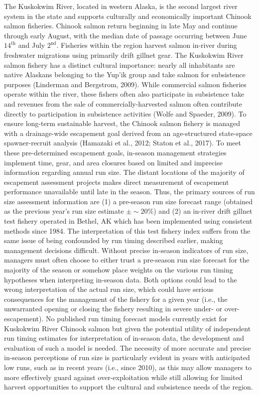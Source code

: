 \documentclass[12pt,]{book}
\theoremstyle{definition}
\theoremstyle{definition}
\theoremstyle{definition}
\theoremstyle{remark}
\begin{document}
The Kuskokwim River, located in western Alaska, is the second largest
river system in the state and supports culturally and economically
important Chinook salmon fisheries. Chinook salmon return beginning in
late May and continue through early August, with the median date of
passage occurring between June \(14^{\text{th}}\) and July
\(2^{\text{nd}}\). Fisheries within the region harvest salmon in-river
during freshwater migrations using primarily drift gillnet gear. The
Kuskokwim River salmon fishery has a distinct cultural importance:
nearly all inhabitants are native Alaskans belonging to the Yup'ik group
and take salmon for subsistence purposes (Linderman and Bergstrom,
2009). While commercial salmon fisheries operate within the river, these
fishers often also participate in subsistence take and revenues from the
sale of commercially-harvested salmon often contribute directly to
participation in subsistence activities (Wolfe and Spaeder, 2009). To
ensure long-term sustainable harvest, the Chinook salmon fishery is
managed with a drainage-wide escapement goal derived from an
age-structured state-space spawner-recruit analysis (Hamazaki et al.,
2012; Staton et al., 2017). To meet these pre-determined escapement
goals, in-season management strategies implement time, gear, and area
closures based on limited and imprecise information regarding annual run
size. The distant locations of the majority of escapement assessment
projects makes direct measurement of escapement performance unavailable
until late in the season. Thus, the primary sources of run size
assessment information are (1) a pre-season run size forecast range
(obtained as the previous year's run size estimate \(\pm \sim 20\%\))
and (2) an in-river drift gillnet test fishery operated in Bethel, AK
which has been implemented using consistent methods since 1984. The
interpretation of this test fishery index suffers from the same issue of
being confounded by run timing described earlier, making management
decisions difficult. Without precise in-season indicators of run size,
managers must often choose to either trust a pre-season run size
forecast for the majority of the season or somehow place weights on the
various run timing hypotheses when interpreting in-season data. Both
options could lead to the wrong interpretation of the actual run size,
which could have serious consequences for the management of the fishery
for a given year (i.e., the unwarranted opening or closing the fishery
resulting in severe under- or over-escapement). No published run timing
forecast models currently exist for Kuskokwim River Chinook salmon but
given the potential utility of independent run timing estimates for
interpretation of in-season data, the development and evaluation of such
a model is needed. The necessity of more accurate and precise in-season
perceptions of run size is particularly evident in years with
anticipated low runs, such as in recent years (i.e., since 2010), as
this may allow managers to more effectively guard against
over-exploitation while still allowing for limited harvest opportunities
to support the cultural and subsistence needs of the region.
\end{document}

